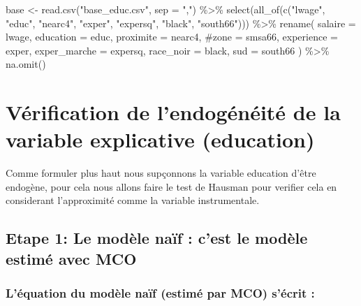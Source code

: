 \documentclass[
  letterpaper,
  DIV=11,
  numbers=noendperiod]{scrartcl}
\newenvironment{Shaded}{\begin{snugshade}}{\end{snugshade}}
\newcommand{\AttributeTok}[1]{\textcolor[rgb]{0.40,0.45,0.13}{#1}}
\newcommand{\CommentTok}[1]{\textcolor[rgb]{0.37,0.37,0.37}{#1}}
\newcommand{\FunctionTok}[1]{\textcolor[rgb]{0.28,0.35,0.67}{#1}}
\newcommand{\NormalTok}[1]{\textcolor[rgb]{0.00,0.23,0.31}{#1}}
\newcommand{\OtherTok}[1]{\textcolor[rgb]{0.00,0.23,0.31}{#1}}
\newcommand{\SpecialCharTok}[1]{\textcolor[rgb]{0.37,0.37,0.37}{#1}}
\newcommand{\StringTok}[1]{\textcolor[rgb]{0.13,0.47,0.30}{#1}}
\begin{document}
\begin{Shaded}
\begin{Highlighting}[]
\NormalTok{base }\OtherTok{\textless{}{-}} \FunctionTok{read.csv}\NormalTok{(}\StringTok{"base\_educ.csv"}\NormalTok{, }\AttributeTok{sep =} \StringTok{","}\NormalTok{) }\SpecialCharTok{\%\textgreater{}\%}
  \FunctionTok{select}\NormalTok{(}\FunctionTok{all\_of}\NormalTok{(}\FunctionTok{c}\NormalTok{(}\StringTok{"lwage"}\NormalTok{, }\StringTok{"educ"}\NormalTok{, }\StringTok{"nearc4"}\NormalTok{, }\StringTok{"exper"}\NormalTok{, }\StringTok{"expersq"}\NormalTok{, }\StringTok{"black"}\NormalTok{, }\StringTok{"south66"}\NormalTok{))) }\SpecialCharTok{\%\textgreater{}\%}
  \FunctionTok{rename}\NormalTok{(}
    \AttributeTok{salaire =}\NormalTok{ lwage,}
    \AttributeTok{education =}\NormalTok{ educ,}
    \AttributeTok{proximite =}\NormalTok{ nearc4,}
    \CommentTok{\#zone = smsa66,}
    \AttributeTok{experience =}\NormalTok{ exper,}
    \AttributeTok{exper\_marche =}\NormalTok{ expersq,}
    \AttributeTok{race\_noir =}\NormalTok{ black,}
    \AttributeTok{sud =}\NormalTok{ south66}
\NormalTok{  ) }\SpecialCharTok{\%\textgreater{}\%}
  \FunctionTok{na.omit}\NormalTok{()}
\end{Highlighting}
\end{Shaded}

\section{Vérification de l'endogénéité de la variable explicative
(education)}\label{vuxe9rification-de-lendoguxe9nuxe9ituxe9-de-la-variable-explicative-education}

Comme formuler plus haut nous supçonnons la variable education d'être
endogène, pour cela nous allons faire le test de Hausman pour verifier
cela en considerant l'approximité comme la variable instrumentale.

\subsection{Etape 1: Le modèle naïf : c'est le modèle estimé avec
MCO}\label{etape-1-le-moduxe8le-nauxeff-cest-le-moduxe8le-estimuxe9-avec-mco}

\subsubsection{L'équation du modèle naïf (estimé par MCO) s'écrit
:}\label{luxe9quation-du-moduxe8le-nauxeff-estimuxe9-par-mco-suxe9crit}
\end{document}

